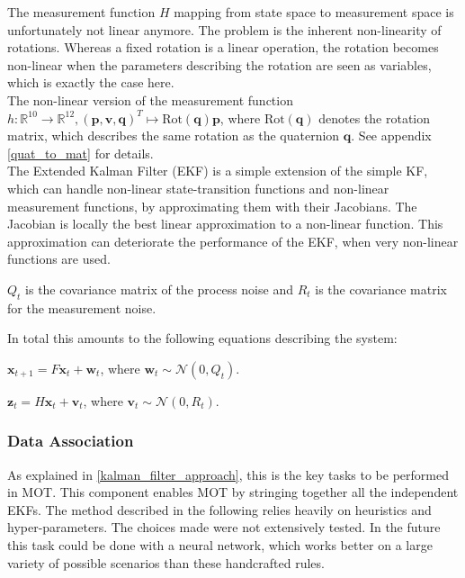 \documentclass{article}
\begin{document}
The measurement function $H$ mapping from state space to measurement space is unfortunately not linear anymore. The problem is the inherent non-linearity of rotations. Whereas a fixed rotation is a linear operation, the rotation becomes non-linear when the parameters describing the rotation are seen as variables, which is exactly the case here. \\
The non-linear version of the measurement function $h: \mathbb{R}^{10} \rightarrow \mathbb{R}^{12}, (\mathbf{p}, \mathbf{v}, \mathbf{q})^T \mapsto \text{Rot}(\mathbf{q})\mathbf{p}$, where $\text{Rot}(\mathbf{q})$ denotes the rotation matrix, which describes the same rotation as the quaternion $\mathbf{q}$. See appendix \ref{quat_to_mat} for details. \\
The Extended Kalman Filter (EKF) is a simple extension of the simple KF, which can handle non-linear state-transition functions and non-linear measurement functions, by approximating them with their Jacobians. The Jacobian is locally the best linear approximation to a non-linear function. This approximation can deteriorate the performance of the EKF, when very non-linear functions are used. %

$Q_t$ is the covariance matrix of the process noise and $R_t$ is the covariance matrix for the measurement noise.

In total this amounts to the following equations describing the system:

$\mathbf{x}_{t+1} = F\mathbf{x}_t + \mathbf{w}_t$, where $\mathbf{w}_t \sim \mathcal{N}(0, Q_t)$.

$\mathbf{z}_{t} = H\mathbf{x}_t + \mathbf{v}_t$, where $\mathbf{v}_t \sim \mathcal{N}(0, R_t)$.


\subsubsection{Data Association}
\label{heuristics}
As explained in \ref{kalman_filter_approach}, this is the key tasks to be performed in MOT. This component enables MOT by stringing together all the independent EKFs. The method described in the following relies heavily on heuristics and hyper-parameters. The choices made were not extensively tested. In the future this task could be done with a neural network, which works better on a large variety of possible scenarios than these handcrafted rules.
\end{document}
